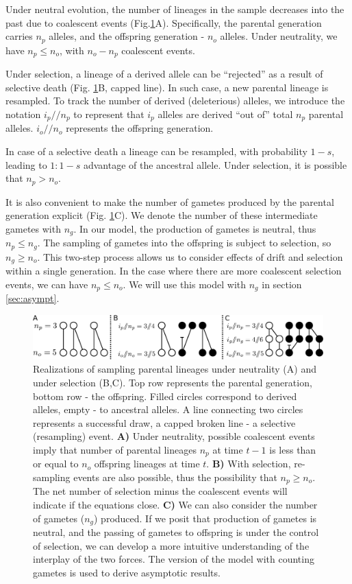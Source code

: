 \documentclass[review]{elsarticle}
\newcommand{\dslash}{/\!\!/}
\begin{document}
Under neutral evolution, the number of lineages in the sample decreases into the past due to
coalescent events (Fig.\ref{fig:schematic}A). Specifically, the parental generation carries $n_p$
alleles, and the offspring generation - $n_o$ alleles. Under neutrality, we have $n_p \le n_o$, with
$n_o-n_p$ coalescent events.

Under selection, a lineage of a derived allele can be ``rejected'' as a result of selective death
(Fig. \ref{fig:schematic}B, capped line). In such case, a new parental lineage is resampled. To
track the number of derived (deleterious) alleles, we introduce the notation $i_p \dslash n_p$ to
represent that $i_p$ alleles are derived ``out of'' total $n_p$ parental alleles. $i_o \dslash n_o$
represents the offspring generation.

In case of a selective death a lineage can be resampled, with probability $1-s$, leading to $1:1-s$
advantage of the ancestral allele. Under selection, it is possible that $n_p > n_o$.

It is also convenient to make the number of gametes produced by the parental generation explicit
(Fig. \ref{fig:schematic}C). We denote the number of these intermediate gametes with $n_g$. In our
model, the production of gametes is neutral, thus $n_p \le n_g$. The sampling of gametes into the
offspring is subject to selection, so $n_g \ge n_o$. This two-step process allows us to consider
effects of drift and selection within a single generation. In the case where there are more
coalescent selection events, we can have $n_p \le n_o$. We will use this model with $n_g$ in section
\ref{sec:asympt}.

\begin{figure}[h]
  \centering
  \includegraphics[width=1.0\textwidth]{fig/schematic.pdf}
  \caption{\label{fig:schematic} Realizations of sampling parental lineages under neutrality (A) and
    under selection (B,C). Top row represents the parental generation, bottom row - the offspring.
    Filled circles correspond to derived alleles, empty - to ancestral alleles. A line connecting
    two circles represents a successful draw, a capped broken line - a selective (resampling) event.
    \textbf{A)} Under neutrality, possible coalescent events imply that number of parental lineages
    $n_p$ at time $t-1$ is less than or equal to $n_o$ offspring lineages at time $t$. \textbf{B)}
    With selection, re-sampling events are also possible, thus the possibility that $n_p \ge n_o$.
    The net number of selection minus the coalescent events will indicate if the equations close.
    \textbf{C)} We can also consider the number of gametes ($n_g$) produced. If we posit that
    production of gametes is neutral, and the passing of gametes to offspring is under the control
    of selection, we can develop a more intuitive understanding of the interplay of the two forces.
    The version of the model with counting gametes is used to derive asymptotic results. }
\end{figure}
\end{document}
